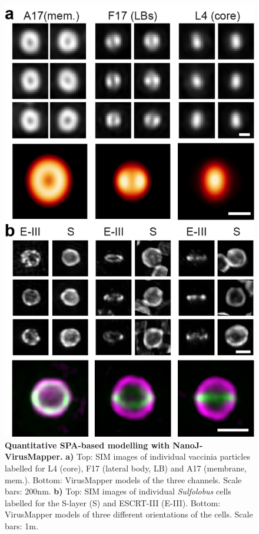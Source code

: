  \begin{figure}[!t]
    \centering
    \includegraphics{Figures/FigureVirusMapper_v2.png}
    \caption{\textbf{Quantitative SPA-based modelling with NanoJ-VirusMapper.} \textbf{a)} Top: SIM images of individual vaccinia particles labelled for L4 (core), F17 (lateral body, LB) and A17 (membrane, mem.). Bottom: VirusMapper models of the three channels. Scale bars: 200nm. \textbf{b)} Top: SIM images of individual \emph{Sulfolobus} cells labelled for the S-layer (S) and ESCRT-III (E-III). Bottom: VirusMapper models of three different orientations of the cells. Scale bars: 1\micro m. }
    \label{fig:VirusMapper}
 \end{figure}

